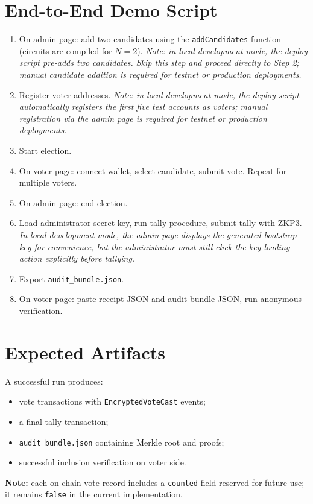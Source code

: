 \section{End-to-End Demo Script}
\begin{enumerate}
    \item On admin page: add two candidates using the \texttt{addCandidates} function (circuits are compiled for $N=2$). \textit{Note: in local development mode, the deploy script pre-adds two candidates. Skip this step and proceed directly to Step 2; manual candidate addition is required for testnet or production deployments.}
    \item Register voter addresses. \textit{Note: in local development mode, the deploy script automatically registers the first five test accounts as voters; manual registration via the admin page is required for testnet or production deployments.}
    \item Start election.
    \item On voter page: connect wallet, select candidate, submit vote. Repeat for multiple voters.
    \item On admin page: end election.
    \item Load administrator secret key, run tally procedure, submit tally with ZKP3. \textit{In local development mode, the admin page displays the generated bootstrap key for convenience, but the administrator must still click the key-loading action explicitly before tallying.}
    \item Export \texttt{audit\_bundle.json}.
    \item On voter page: paste receipt JSON and audit bundle JSON, run anonymous verification.
\end{enumerate}

\section{Expected Artifacts}
A successful run produces:
\begin{itemize}
    \item vote transactions with \texttt{EncryptedVoteCast} events;
    \item a final tally transaction;
    \item \texttt{audit\_bundle.json} containing Merkle root and proofs;
    \item successful inclusion verification on voter side.
\end{itemize}
\noindent\textbf{Note:} each on-chain vote record includes a \texttt{counted} field reserved for future use; it remains \texttt{false} in the current implementation.

\endgroup
